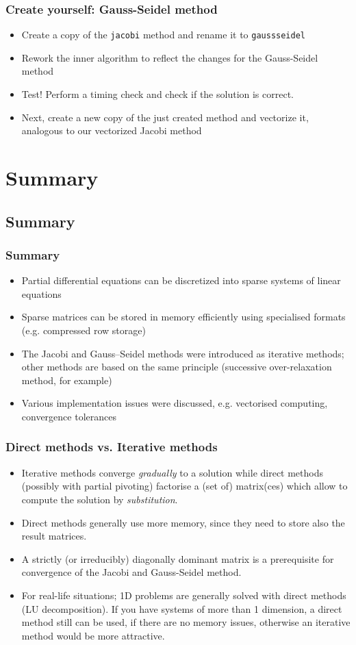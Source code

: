 \begin{frame}[fragile]
  \frametitle{Create yourself: Gauss-Seidel method}
  \begin{itemize}
    \item Create a copy of the \lstinline|jacobi| method and rename it to \lstinline|gaussseidel|
    \item Rework the inner algorithm to reflect the changes for the Gauss-Seidel method
    \item Test! Perform a timing check and check if the solution is correct.
    \item Next, create a new copy of the just created method and vectorize it, analogous to our vectorized Jacobi method
  \end{itemize}
\end{frame}
    
\section{Summary}
\subsection*{Summary}
\begin{frame}[fragile]
  \frametitle{Summary}
  \begin{itemize}
    \item Partial differential equations can be discretized into sparse systems of linear equations
    \item Sparse matrices can be stored in memory efficiently using specialised formats (e.g. compressed row storage)
    \item The Jacobi and Gauss–Seidel methods were introduced as iterative methods; other methods are based on the same principle (successive over-relaxation method, for example)
    \item Various implementation issues were discussed, e.g. vectorised computing, convergence tolerances
  \end{itemize}
\end{frame}

\begin{frame}[fragile]
  \frametitle{Direct methods vs. Iterative methods}
  \begin{itemize}
    \item Iterative methods converge \emph{gradually} to a solution while direct methods (possibly with partial pivoting) factorise a (set of) matrix(ces) which allow to compute the solution by \emph{substitution}.
    \item Direct methods generally use more memory, since they need to store also the result matrices.
    \item A strictly (or irreducibly) diagonally dominant matrix is a prerequisite for convergence of the Jacobi and Gauss-Seidel method.
    \item For real-life situations; 1D problems are generally solved with direct methods (LU decomposition). If you have systems of more than 1 dimension, a direct method still can be used, if there are no memory issues, otherwise an iterative method would be more attractive.
\end{itemize}
\end{frame}